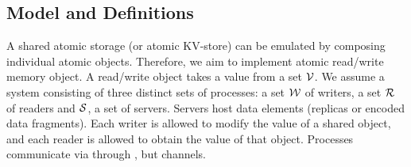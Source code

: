 \subsection{Model and Definitions}\label{model}

A shared atomic storage (or atomic KV-store) can be emulated
by composing individual atomic objects. Therefore, we aim
to implement  atomic read/write memory object. %
A read/write object takes a value from a set ${\mathcal V}$. 
We assume a system consisting of three distinct sets of processes: 
a set $\mathcal{W}$ of writers, a set $\mathcal{R}$ of readers and  $\mathcal{S}$, a set of servers. 
 Servers host data elements (replicas or encoded data fragments).
Each writer is allowed to modify the value of a shared object, and each reader is allowed to obtain 
the value of that object. 
Processes communicate via  through 
, but  channels. 
%



%

